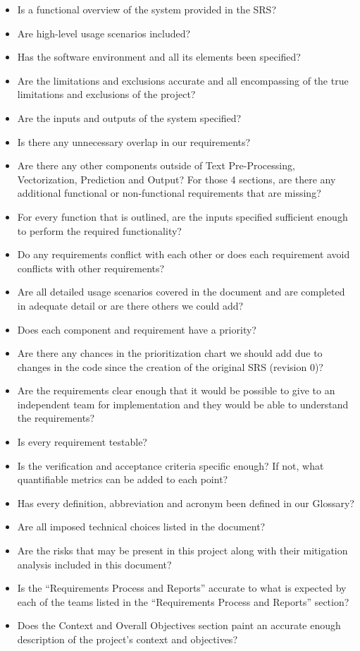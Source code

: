 \documentclass[12pt, titlepage]{article}
\begin{document}
  \begin{itemize}
  \item Is a functional overview of the system provided in the SRS?
  \item Are high-level usage scenarios included?
  \item Has the software environment and all its elements been specified?
  \item Are the limitations and exclusions accurate and all encompassing of the true limitations and exclusions of the project?
  \item Are the inputs and outputs of the system specified?
  \item Is there any unnecessary overlap in our requirements?
  \item Are there any other components outside of Text Pre-Processing, Vectorization, Prediction and Output? For those 4 sections, are there any additional functional or non-functional requirements that are missing?
  \item For every function that is outlined, are the inputs specified sufficient enough to perform the required functionality?
  \item Do any requirements conflict with each other or does each requirement avoid conflicts with other requirements?
  \item Are all detailed usage scenarios covered in the document and are completed in adequate detail or are there others we could add?
  \item Does each component and requirement have a priority?
  \item Are there any chances in the prioritization chart we should add due to changes in the code since the creation of the original SRS (revision 0)?
  \item Are the requirements clear enough that it would be possible to give to an independent team for implementation and they would be able to understand the requirements?
  \item Is every requirement testable?
  \item Is the verification and acceptance criteria specific enough? If not, what quantifiable metrics can be added to each point?
  \item Has every definition, abbreviation and acronym been defined in our Glossary?
  \item Are all imposed technical choices listed in the document?
  \item Are the risks that may be present in this project along with their mitigation analysis included in this document?
  \item Is the “Requirements Process and Reports” accurate to what is expected by each of the teams listed in the “Requirements Process and Reports” section?
  \item Does the Context and Overall Objectives section paint an accurate enough description of the project's context and objectives?\\
  \end{itemize}
  
\end{document}
